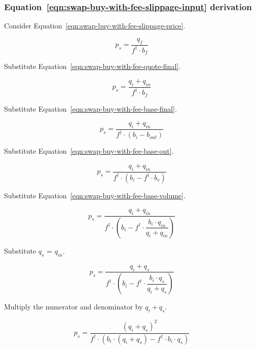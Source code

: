 \subsubsection{Equation~\ref{eqn:swap-buy-with-fee-slippage-input} derivation}%
\label{sssec:equation-eqn-swap-buy-with-fee-slippage-input-derivation}

Consider Equation~\ref{eqn:swap-buy-with-fee-slippage-price}.

\begin{equation*}
	p_s = \frac{q_f}{f^{\dagger} \cdot b_f}
\end{equation*}

Substitute Equation~\ref{eqn:swap-buy-with-fee-quote-final}.

\begin{equation*}
	p_s = \frac{q_i + q_{in}}{f^{\dagger} \cdot b_f}
\end{equation*}

Substitute Equation~\ref{eqn:swap-buy-with-fee-base-final}.

\begin{equation*}
	p_s = \frac{q_i + q_{in}}{f^{\dagger} \cdot (b_i - b_{out})}
\end{equation*}

Substitute Equation~\ref{eqn:swap-buy-with-fee-base-out}.

\begin{equation*}
	p_s = \frac{q_i + q_{in}}{f^{\dagger} \cdot (b_i - f^{\dagger} \cdot b_v)}
\end{equation*}

Substitute Equation~\ref{eqn:swap-buy-with-fee-base-volume}.

\begin{equation*}
	p_s = \frac{q_i + q_{in}}{f^{\dagger} \cdot
  \left(b_i - f^{\dagger} \cdot \dfrac{b_i \cdot q_{in}}{q_i + q_{in}}\right)}
\end{equation*}

Substitute $q_s$ = $q_{in}$.

\begin{equation*}
  p_s = \frac{q_i + q_s}{f^{\dagger} \cdot
  \left(b_i - f^{\dagger} \cdot \dfrac{b_i \cdot q_s}{q_i + q_s}\right)}
\end{equation*}

Multiply the numerator and denominator by $q_i + q_s$.

\begin{equation*}
  p_s = \frac{(q_i + q_s)^2}{f^{\dagger} \cdot
  \left(b_i \cdot (q_i + q_s) - f^{\dagger} \cdot b_i \cdot q_s\right)}
\end{equation*}


